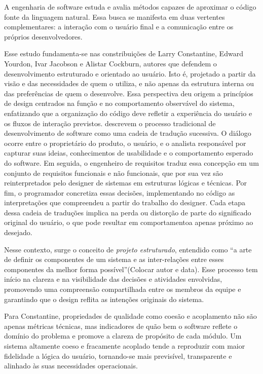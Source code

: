 \documentclass[12pt,a4paper]{article}
\begin{document}
A engenharia de software estuda e avalia métodos capazes de aproximar o código fonte da linguagem natural. Essa busca se manifesta em duas vertentes complementares: a interação com o usuário final e a comunicação entre os próprios desenvolvedores.

Esse estudo fundamenta-se nas constribuições de Larry Constantine, Edward Yourdon, Ivar Jacobson e Alistar Cockburn, autores que defendem o desenvolvimento estruturado e orientado ao usuário. Isto é, projetado a partir da visão e das necessidades de quem o utiliza, e não apenas da estrutura interna ou das preferências de quem o desenvolve. Essa perspectiva deu origem a princípios de design centrados na função e no comportamento observável do sistema, enfatizando que a organização do código deve refletir a experiência do usuário e os fluxos de interação previstos. \textcite{yourdon1978structured} descrevem o processo tradicional de desenvolvimento de software como uma cadeia de tradução sucessiva. O diálogo ocorre entre o proprietário do produto, o usuário, e o analista responsável por capturar suas ideias, conhecimentos de usabilidade e o comportamento esperado do software. Em seguida, o engenheiro de requisitos traduz essa concepção em um conjunto de requisitos funcionais e não funcionais, que por sua vez são reinterpretados pelo designer de sistemas em estruturas lógicas e técnicas. Por fim, o programador concretiza essas decisões, implementando no código as interpretações que compreendeu a partir do trabalho do designer. Cada etapa dessa cadeia de traduções implica na perda ou distorção de parte do significado original do usuário, o que pode resultar em comportamentoa apenas próximo ao desejado.

Nesse contexto, surge o conceito de \textit{projeto estruturado}, entendido como “a arte de definir os componentes de um sistema e as inter-relações entre esses componentes da melhor forma possível”(Colocar autor e data). Esse processo tem início na clareza e na visibilidade das decisões e atividades envolvidas, promovendo uma compreensão compartilhada entre os membros da equipe e garantindo que o design reflita as intenções originais do sistema.

Para Constantine, propriedades de qualidade como coesão e acoplamento não são apenas métricas técnicas, mas indicadores de quão bem o software reflete o domínio do problema e promove a clareza de propósito de cada módulo. Um sistema altamente coeso e fracamente acoplado tende a reproduzir com maior fidelidade a lógica do usuário, tornando-se mais previsível, transparente e alinhado às suas necessidades operacionais.
\end{document}
